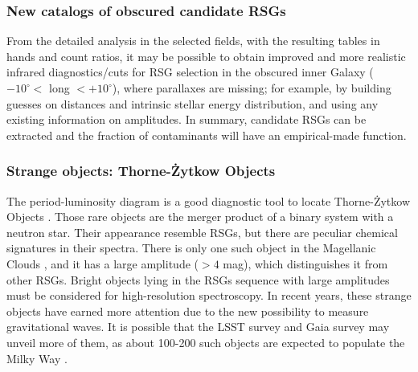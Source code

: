 \documentclass[final,11pt,onecolumn,a4paper,twoside]{scrbook_gj}
\begin{document}
\subsubsection{New catalogs of obscured candidate RSGs}
From the detailed analysis in the selected fields,
with the resulting tables in hands and count ratios, 
it may be possible to obtain improved and more realistic
infrared diagnostics/cuts for RSG selection in 
the obscured inner Galaxy
($-10^\circ <$ long $<+10^\circ$), where parallaxes
are missing; for example, by building guesses on distances and 
intrinsic stellar energy distribution, 
and using any existing information
on amplitudes. In summary, candidate RSGs can be extracted and the 
fraction of contaminants will
have an empirical-made function.


\subsubsection{Strange objects: Thorne-\.{Z}ytkow Objects}

The period-luminosity diagram is a good diagnostic tool
to locate Thorne-\.{Z}ytkow Objects \citep[e.g.][]{grady20,demarchi21}. 
Those rare objects
are the merger product of a binary system with a neutron star. 
Their appearance resemble RSGs, but there are peculiar 
chemical signatures in their spectra. 
There is only one such  object in the Magellanic Clouds 
\citep{levesque14},
and it has a large amplitude ($>4$ mag), which distinguishes 
it from other RSGs. Bright objects lying in the RSGs sequence
with large amplitudes must be considered for high-resolution
spectroscopy. In  recent years, 
these strange objects have earned more attention
due to the new possibility to measure gravitational waves.
It is possible that the LSST survey and Gaia survey 
may unveil more of them,
as about 100-200 such objects
are expected to populate the  Milky Way \citep[e.g.][]{demarchi21}.



\end{document}
